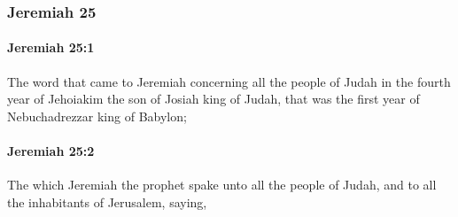 	\subsubsection{Jeremiah 25} %
		\label{JEREMIAH-25}

		\paragraph{Jeremiah 25:1} %
			\label{JEREMIAH-25-1}

			The word that came to Jeremiah concerning all the people of Judah in the fourth year of Jehoiakim the son of Josiah king of Judah, that was the first year of Nebuchadrezzar king of Babylon;


		\paragraph{Jeremiah 25:2} %
			\label{JEREMIAH-25-2}

			The which Jeremiah the prophet spake unto all the people of Judah, and to all the inhabitants of Jerusalem, saying,

